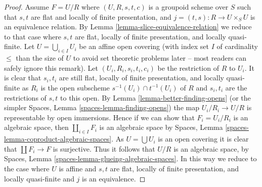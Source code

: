 \begin{proof}
\medskip\noindent
Assume $F = U/R$ where $(U, R, s, t, c)$ is a groupoid scheme
over $S$ such that $s, t$ are flat and locally of finite presentation, and
$j = (t, s) : R \to U \times_S U$ is an equivalence relation. By
Lemma \ref{lemma-slice-equivalence-relation}
we reduce to that case where $s, t$ are flat,
locally of finite presentation, and locally quasi-finite.
Let $U = \bigcup_{i \in I} U_i$ be an affine open covering
(with index set $I$ of cardinality $\leq$ than the size of $U$ to avoid
set theoretic problems later -- most readers can safely ignore this remark). 
Let $(U_i, R_i, s_i, t_i, c_i)$ be the restriction of $R$
to $U_i$. It is clear that $s_i, t_i$ are still flat, locally of finite
presentation, and locally quasi-finite as $R_i$ is the open subscheme
$s^{-1}(U_i) \cap t^{-1}(U_i)$ of $R$
and $s_i, t_i$ are the restrictions of $s, t$ to this open. By
Lemma \ref{lemma-better-finding-opens}
(or the simpler
Spaces, Lemma \ref{spaces-lemma-finding-opens})
the map $U_i/R_i \to U/R$ is representable by open immersions.
Hence if we can show that $F_i = U_i/R_i$ is an algebraic space, then
$\coprod_{i \in I} F_i$ is an algebraic space by
Spaces, Lemma \ref{spaces-lemma-coproduct-algebraic-spaces}.
As $U = \bigcup U_i$ is an open covering it is clear that
$\coprod F_i \to F$ is surjective. Thus
it follows that $U/R$ is an algebraic space, by
Spaces, Lemma \ref{spaces-lemma-glueing-algebraic-spaces}.
In this way we reduce to the case where $U$ is affine and $s, t$ are flat,
locally of finite presentation, and locally quasi-finite and
$j$ is an equivalence.


\end{proof}
